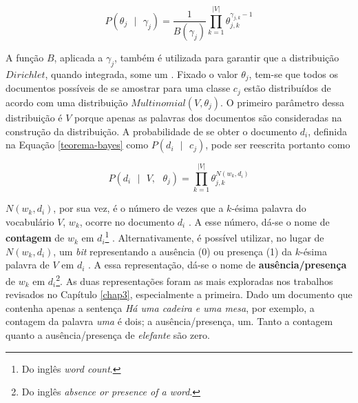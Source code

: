 \begin{equation}
\label{dirichlet}
  \ensuremath{P(\theta_j\mbox{ } |\mbox{ } \gamma_j) = \frac{1}{B(\gamma_j)}\prod_{k = 1}^{|V|}\theta_{j,k}^{\gamma_{j,k} - 1}}
\end{equation}

A função \ensuremath{B}, aplicada a \ensuremath{\gamma_j}, também é utilizada para garantir que a distribuição \ensuremath{Dirichlet}, quando integrada, some um \cite{stat-distribs}. Fixado o valor \ensuremath{\theta_j}, tem-se que todos os documentos possíveis de se amostrar para uma classe \ensuremath{c_j} estão distribuídos de acordo com uma distribuição \ensuremath{Multinomial(V, \theta_j)}. O primeiro parâmetro dessa distribuição é \ensuremath{V} porque apenas as palavras dos documentos são consideradas na construção da distribuição. A probabilidade de se obter o documento \ensuremath{d_i}, definida na Equação \ref{teorema-bayes} como \ensuremath{P(d_i\mbox{ }|\mbox{ }c_j)}, pode ser reescrita portanto como \cite{resnik}

\begin{equation}
\label{multinomial}
\ensuremath{P(d_i\mbox{ } |\mbox{ } V,\mbox{ } \theta_j)  = \prod_{k = 1}^{|V|}\theta_{j,k}^{N(w_k, d_i)}}
\end{equation}

\ensuremath{N(w_k, d_i)}, por sua vez, é o número de vezes que a \ensuremath{k}-ésima palavra do vocabulário \ensuremath{V}, \ensuremath{w_k}, ocorre no documento \ensuremath{d_i} \cite{resnik}. A esse número, dá-se o nome de \textbf{contagem} de \ensuremath{w_k} em \ensuremath{d_i}\footnote{Do inglês \emph{word count}.} \cite{mccallum-nigam}. Alternativamente, é possível utilizar, no lugar de \ensuremath{N(w_k, d_i)}, um \emph{bit} representando a ausência (0) ou presença (1) da \ensuremath{k}-ésima palavra de \ensuremath{V} em \ensuremath{d_i} \cite{mccallum-nigam}. A essa representação, dá-se o nome de \textbf{ausência/presença} de \ensuremath{w_k} em \ensuremath{d_i}\footnote{Do inglês \emph{absence or presence of a word}.}. As duas representações foram as mais exploradas nos trabalhos revisados no Capítulo \ref{chap3}, especialmente a primeira. Dado um documento que contenha apenas a sentença \emph{Há uma cadeira e uma mesa}, por exemplo, a contagem da palavra \emph{uma} é dois; a ausência/presença, um. Tanto a contagem quanto a ausência/presença de \emph{elefante} são zero.


